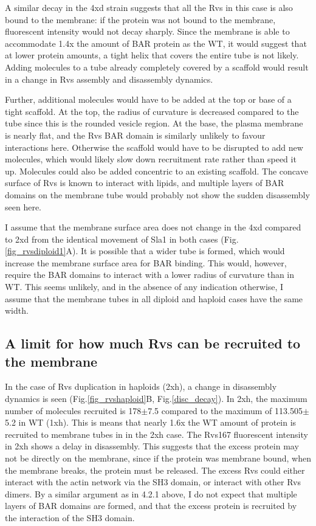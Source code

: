 	\vspace{5mm}
A similar decay in the 4xd strain suggests that all the Rvs in this case is also bound to the membrane: if the protein was not bound to the membrane, fluorescent intensity would not decay sharply. Since the membrane is able to accommodate 1.4x the amount of BAR protein as the WT, it would suggest that at lower protein amounts, a tight helix that covers the entire tube is not likely. Adding molecules to a tube already completely covered by a scaffold would result in a change in Rvs assembly and disassembly dynamics. 

Further, additional molecules would have to be added at the top or base of a tight scaffold. At the top, the radius of curvature is decreased compared to the tube since this is the rounded vesicle region. At the base, the plasma membrane is nearly flat, and the Rvs BAR domain is similarly unlikely to favour interactions here. Otherwise the scaffold would have to be disrupted to add new molecules, which would likely slow down recruitment rate rather than speed it up. Molecules could also be added concentric to an existing scaffold. The concave surface of Rvs is known to interact with lipids, and multiple layers of BAR domains on the membrane tube would probably not show the sudden disassembly seen here.  

I assume that the membrane surface area does not change in the 4xd compared to 2xd from the identical movement of Sla1 in both cases (Fig.\ref{fig_rvsdiploid1}A). It is possible that a wider tube is formed, which would increase the membrane surface area for BAR binding. This would, however, require the BAR domains to interact with a lower radius of curvature than in WT. This seems unlikely, and in the absence of any indication otherwise, I assume that the membrane tubes in all diploid and haploid cases have the same width.


\subsection{A limit for how much Rvs can be recruited to the membrane}
In the case of Rvs duplication in haploids (2xh), a change in disassembly dynamics is seen (Fig.\ref{fig_rvshaploid}B, Fig.\ref{disc_decay}). In 2xh, the maximum number of molecules recruited is 178$\pm$7.5 compared to the maximum of 113.505$\pm$5.2 in WT (1xh). This is means that nearly 1.6x the WT amount of protein is recruited to membrane tubes in in the 2xh case. The Rvs167 fluorescent intensity in 2xh shows a delay in disassembly. This suggests that the excess protein may not be directly on the membrane, since if the protein was membrane bound, when the membrane breaks, the protein must be released. The excess Rvs could either interact with the actin network via the SH3 domain, or interact with other Rvs dimers. By a similar argument as in 4.2.1 above, I do not expect that multiple layers of BAR domains are formed, and that the excess protein is recruited by the interaction of the SH3 domain. 


